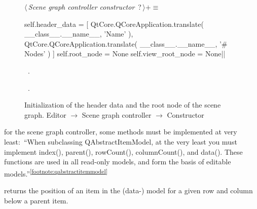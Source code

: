 \documentclass[%
    a4paper,    %
    justified,  %
    nobib,      %
    openany     %
]{tufte-book}
\makeatletter
\renewcommand{\label}[1]{\@tufte@label{##1}}%
\newcommand{\footref}[1]{\textsuperscript{\ref{#1}}}
\makeatother
\begin{document}
\begin{figure}
\begin{flushleft} \small
\begin{minipage}{\linewidth}\label{scrap30}\raggedright\small
{} $\langle\,${\itshape Scene graph controller constructor}\nobreak\ {\footnotesize {?}}$\,\rangle+\equiv$
\vspace{-1ex}
\begin{pythoncode}
    self.header_data = [
        QtCore.QCoreApplication.translate(
            __class__.__name__, 'Name'
        ),
        QtCore.QCoreApplication.translate(
            __class__.__name__, '# Nodes'
        )
    ]
    self.root_node = None
    self.view_root_node = None|\NWsep|
\end{pythoncode}
\vspace{1.5ex}
\footnotesize
\begin{list}{}{\setlength{\itemsep}{-\parsep}\setlength{\itemindent}{-\leftmargin}}
\item \NWtxtMacroDefBy\ .
\item \NWtxtMacroRefIn\ .

\item{}
\end{list}
\end{minipage}\vspace{4ex}
\end{flushleft}
\caption{Initialization of the header data and the root node of the scene graph.
  \newline{}\newline{}Editor $\rightarrow$ Scene graph controller $\rightarrow$
  Constructor}
\label{editor:lst:scene-graph-controller:constructor:header-data}
\end{figure}


 for the scene graph
controller, some methods must be implemented at very least:~\enquote{When
subclassing QAbstractItemModel, at the very least you must implement index(),
parent(), rowCount(), columnCount(), and data(). These functions are used in all
read-only models, and form the basis of editable
models.}\footref{footnote:qabstractitemmodel}

 returns the position of an item in the (data-)
model for a given row and column below a parent item.
\end{document}
